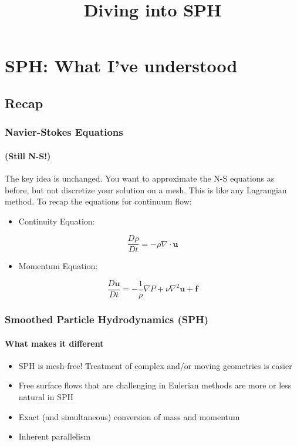 \documentclass[notheorems, aspectratio=169]{beamer}
\title[Diving into SPH]{Diving into SPH}
\institute[]{}
\date{}
\begin{document}
\begin{frame}
    \titlepage
\end{frame}


\section{SPH: What I've understood} 
\frame{\tableofcontents[currentsection]}

\subsection{Recap}

\begin{frame}[fragile]
  \frametitle{Navier-Stokes Equations}
  \framesubtitle{(Still N-S!)}
  
  The key idea is unchanged. You want to approximate the N-S equations as before, but not discretize your solution on a mesh. This is like any Lagrangian method. To recap the equations for continuum flow:
  
  \begin{itemize}
    \item Continuity Equation:
  \end{itemize}
  
  \[
  \frac{D\rho}{Dt} = -\rho \nabla \cdot \mathbf{u}
  \]
  
  \begin{itemize}
    \item Momentum Equation:
  \end{itemize}
  
  \[
  \frac{D\mathbf{u}}{Dt} = -\frac{1}{\rho}\nabla P + \nu\nabla^2\mathbf{u} + \mathbf{f}
  \]
  
  
  \end{frame}

  
\begin{frame}[fragile]
  \frametitle{Smoothed Particle Hydrodynamics (SPH)}
  \framesubtitle{What makes it different}
  
  \begin{itemize}
    \item SPH is mesh-free! Treatment of complex and/or moving geometries is easier
    \item Free surface flows that are challenging in Eulerian methods are more or less natural in SPH
    \item Exact (and simultaneous) conversion of mass and momentum
    \item Inherent parallelism
  \end{itemize}
  
  \end{frame}
  
\end{document}
